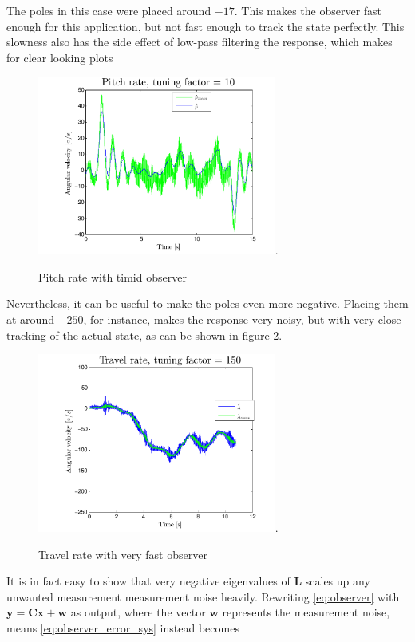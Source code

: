 The poles in this case were placed around $-17$. This makes the observer fast enough for this application, but not fast enough to track the state perfectly. This slowness also has the side effect of low-pass filtering the response, which makes for clear looking plots \\
\begin{figure}[htb]
	\centering
		\includegraphics[width=0.7\textwidth,trim={0cm 0cm 0cm 0cm},clip]{figures/P4p2_pitch_rate_tuning_factor_10.pdf}.
	\caption{Pitch rate with timid observer}
\label{fig:P4p2_pitch_rate_10}
\end{figure}
Nevertheless, it can be useful to make the poles even more negative. Placing them at around $-250$, for instance, makes the response very noisy, but with very close tracking of the actual state, as can be shown in figure \ref{fig:P4p2_travel_rate_150}.\\
\begin{figure}[htb]
	\centering
		\includegraphics[width=0.7\textwidth,trim={0cm 0cm 0cm 0cm},clip]{figures/P4p2_travel_rate_tuning_factor_150_OLD.pdf}.
	\caption{Travel rate with very fast observer}
\label{fig:P4p2_travel_rate_150}
\end{figure}
It is in fact easy to show that very negative eigenvalues of $\mathbf{L}$ scales up any unwanted measurement measurement noise heavily. Rewriting \eqref{eq:observer} with $\mathbf{y} = \mathbf{Cx} + \mathbf{w}$ as output, where the vector $\mathbf{w}$ represents the measurement noise, means \eqref{eq:observer_error_sys} instead becomes
